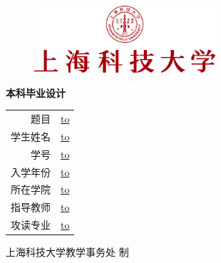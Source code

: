 \thispagestyle{titlepage}

\begin{figure}[!htb]
  \begin{center}
    \includegraphics[width=0.6\textwidth]{style/img/emblem_vstack_zh.pdf}
  \end{center}
\end{figure}

\vspace{1cm}
\begin{center}
\Huge\sffamily\textbf{本科毕业设计}
\end{center}
\vfill

\vspace{3cm}
\begin{center}
{\def\arraystretch{1.5}
\makeatletter
  \begin{tabular}{Mc}
  题目 &
  \underline{\hbox to \@metaBlankLen{\hfill\@titleZh\hfill}} \\
  学生姓名 &
  \underline{\hbox to \@metaBlankLen{\hfill\@studentNameZh\hfill}} \\
  学号 &
  \underline{\hbox to \@metaBlankLen{\hfill\@studentId\hfill}} \\
  入学年份 &
  \underline{\hbox to } \\
  所在学院 &
  \underline{\hbox to \@metaBlankLen{\hfill\@departmentNameZh\hfill}} \\
  指导教师 &
  \underline{\hbox to \@metaBlankLen{\hfill\@advisorNameZh\hfill}} \\
  攻读专业 &
  \underline{\hbox to \@metaBlankLen{\hfill\@majorNameZh\hfill}} \\
\end{tabular}
\makeatother}
\end{center}

\vfill

\begin{center}
上海科技大学教学事务处 制\\
\zhtoday
\end{center}

\cleardoublepage
